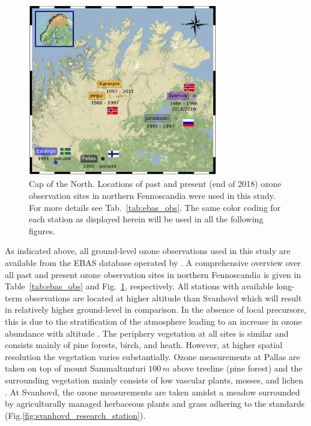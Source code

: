 \documentclass[bg, manuscript]{copernicus}
\begin{document}
\begin{figure}[t]
  \includegraphics[width=8.3cm]{fig03}
  \caption{Cap of the North. Locations of past and present (end of 2018) ozone observation sites in northern Fennoscandia were used in this study. For more details see Tab.~\ref{tab:ebas_obs}. The same color coding for each station as displayed herein will be used in all the following figures.}
  \label{fig:station_map_fennoscandia}
\end{figure}


As indicated above, all ground-level ozone observations used in this study are available from the EBAS database operated by \citet{NILU_EBAS}. A comprehensive overview over all past and present ozone observation sites in northern Fennoscandia is given in Table~\ref{tab:ebas_obs} and Fig.~\ref{fig:station_map_fennoscandia}, respectively. All stations with available long-term observations are located at higher altitude than Svanhovd which will result in relatively higher ground-level \chem{[O_3]} in comparison. In the absence of local precursors, this is due to the stratification of the atmosphere leading to an increase in ozone abundance with altitude \citep[e.g.,][]{AB:Klingberg2009}. The periphery vegetation at all sites is similar and consists mainly of pine forests, birch, and heath. However, at higher spatial resolution the vegetation varies substantially. Ozone measurements at Pallas are taken on top of mount Sammaltunturi $100\,\unit{m}$ above treeline (pine forest) and the surrounding vegetation mainly consists of low vascular plants, mosses, and lichen \citep{BER:Hatakka2003}. At Svanhovd, the ozone measurements are taken amidst a meadow surrounded by agriculturally managed herbaceous plants and grass adhering to the \citet{WMOGuide2018} standards (Fig.\ref{fig:svanhovd_research_station}).
\end{document}
